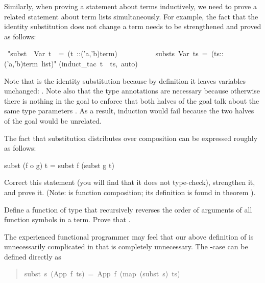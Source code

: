 \begin{isabelle}
\begin{isamarkuptext}
Similarly, when proving a statement about terms inductively, we need
to prove a related statement about term lists simultaneously. For example,
the fact that the identity substitution does not change a term needs to be
strengthened and proved as follows:%
\end{isamarkuptext}%
\ {"}subst\ \ Var\ t\ \ =\ (t\ ::('a,'b)term)\ \ {\isasymand}\isanewline
\ \ \ \ \ \ \ \ substs\ Var\ ts\ =\ (ts::('a,'b)term\ list){"}\isanewline
{}(induct\_tac\ t\ \ ts,\ auto)%
\begin{isamarkuptext}%
\noindent
Note that  is the identity substitution because by definition it
leaves variables unchanged: . Note also
that the type annotations are necessary because otherwise there is nothing in
the goal to enforce that both halves of the goal talk about the same type
parameters . As a result, induction would fail
because the two halves of the goal would be unrelated.

\begin{exercise}
The fact that substitution distributes over composition can be expressed
roughly as follows:
\begin{ttbox}
subst (f o g) t = subst f (subst g t)
\end{ttbox}
Correct this statement (you will find that it does not type-check),
strengthen it, and prove it. (Note:  is function composition;
its definition is found in theorem ).
\end{exercise}
\begin{exercise}\label{ex:trev-trev}
  Define a function  of type  that
  recursively reverses the order of arguments of all function symbols in a
  term. Prove that .
\end{exercise}

The experienced functional programmer may feel that our above definition of
 is unnecessarily complicated in that  is completely
unnecessary. The -case can be defined directly as
\begin{quote}

\begin{isabelle}%
subst\ \mbox{s}\ (App\ \mbox{f}\ \mbox{ts})\ =\ App\ \mbox{f}\ (map\ (subst\ \mbox{s})\ \mbox{ts})
\end{isabelle}%


\end{quote}
\end{isamarkuptext}
\end{isabelle}
